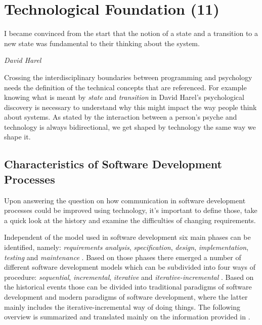 \chapter{Technological Foundation (11)}
\label{chap:technological-foundation}
\epigraph{I became convinced from the start that the notion of a state and a transition to a new state was fundamental to their thinking about the system.}{\textit{David Harel}}
Crossing the interdisciplinary boundaries between programming and psychology needs the definition of the technical concepts that are referenced.
For example knowing what is meant by \emph{state} and \emph{transition} in David Harel's psychological discovery is necessary to understand why this might impact the way people think about systems. 
As stated by \textcite{schraube_ich_2012} the interaction between a person's psyche and technology is always bidirectional, we get shaped by technology the same way we shape it.

\section{Characteristics of Software Development Processes}
\label{sec:characteristics-of-software-development-processes}
Upon answering the question on how communication in software development processes could be improved using technology, it's important to define those, take a quick look at the history and examine the difficulties of changing requirements.

Independent of the model used in software development six main phases can be identified, namely: \emph{requirements analysis}, \emph{specification}, \emph{design}, \emph{implementation}, \emph{testing} and \emph{maintenance} \autocite{harel_statecharts:_1987}.
Based on those phases there emerged a number of different software development models which can be subdivided into four ways of procedure: \emph{sequential}, \emph{incremental}, \emph{iterative} and \emph{iterative-incremental} \autocite{mayr_projekt_2005}.
Based on the historical events those can be divided into traditional paradigms of software development and modern paradigms of software development, where the latter mainly includes the iterative-incremental way of doing things.
The following overview is summarized and translated mainly on the information provided in \autocite{mayr_projekt_2005}.

